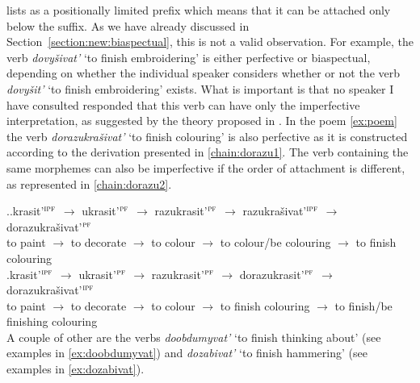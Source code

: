 \citet{Tatevosov:09} lists  as a positionally limited prefix which means that it can be attached only below the  suffix. As we have already discussed in Section~\ref{section:new:biaspectual}, this is not a valid observation. For example, the verb \textit{dovy\v{s}ivat'} `to finish embroidering' is either perfective or biaspectual, depending on whether the individual speaker considers whether or not the verb \textit{dovy\v{s}it'} `to finish embroidering' exists. What is important is that no speaker I have consulted responded that this verb can have only the imperfective interpretation, as suggested by the theory proposed in \citealt{Tatevosov:09}. In the poem \ref{ex:poem} the verb \textit{dorazukra\v{s}ivat'} `to finish colouring' is also perfective as it is constructed according to the derivation presented in \ref{chain:dorazu1}. The verb containing the same morphemes can also be imperfective if the order of attachment is different, as represented in \ref{chain:dorazu2}.

\ex.\ag.\label{chain:dorazu1}krasit'$^{\textsc{ipf}}$ $\rightarrow$ ukrasit'$^{\textsc{pf}}$ $\rightarrow$ razukrasit'$^{\textsc{pf}}$ $\rightarrow$ razukra\v{s}ivat'$^{\textsc{ipf}}$ $\rightarrow$ dorazukra\v{s}ivat'$^{\textsc{pf}}$\\
{to paint} $\rightarrow$ {to decorate} $\rightarrow$ {to colour} $\rightarrow$ {to colour/be colouring} $\rightarrow$ {to finish colouring}\\
\bg.\label{chain:dorazu2}krasit'$^{\textsc{ipf}}$ $\rightarrow$ ukrasit'$^{\textsc{pf}}$ $\rightarrow$ razukrasit'$^{\textsc{pf}}$ $\rightarrow$ dorazukrasit'$^{\textsc{pf}}$ $\rightarrow$ dorazukra\v{s}ivat'$^{\textsc{ipf}}$\\
{to paint} $\rightarrow$ {to decorate} $\rightarrow$ {to colour} $\rightarrow$ {to finish colouring} $\rightarrow$ {to finish/be finishing colouring}\\

A couple of other  are the verbs \textit{doobdumyvat'} `to finish thinking about' (see examples in \ref{ex:doobdumyvat}) and \textit{dozabivat'} `to finish hammering' (see examples in \ref{ex:dozabivat}).


